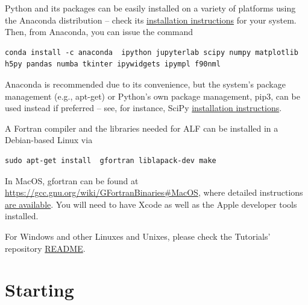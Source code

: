 \documentclass[10pt,modern]{scrartcl}
\numberwithin{exerciseitem}{exercise} %
\newcommand{\ALFver}{2.4}          %
\newcommand{\tutALFver}{2.4}       %
\begin{document}
Python and its packages can be easily installed on a variety of platforms using the Anaconda distribution -- check its \href{https://docs.anaconda.com/anaconda/install/}{installation instructions} for your system. Then, from Anaconda, you can issue the command
\begin{lstlisting}[style=bash]
conda install -c anaconda  ipython jupyterlab scipy numpy matplotlib h5py pandas numba tkinter ipywidgets ipympl f90nml
\end{lstlisting}
Anaconda is recommended due to its convenience, but the system's package management (e.g., apt-get) or Python's own package management, pip3, can be used instead if preferred -- see, for instance, SciPy \href{https://www.scipy.org/install.html}{installation instructions}.

A Fortran compiler and the libraries needed for ALF can be installed in a Debian-based Linux via
\begin{lstlisting}[style=bash]
sudo apt-get install  gfortran liblapack-dev make
\end{lstlisting}
In MacOS, gfortran can be found at \url{https://gcc.gnu.org/wiki/GFortranBinaries#MacOS}, where detailed instructions \href{https://gcc.gnu.org/wiki/GFortranBinariesMacOS}{are available}. You will need to have Xcode as well as the Apple developer tools installed.

For Windows and other Linuxes and Unixes, please check the Tutorials' repository \href{https://git.physik.uni-wuerzburg.de/ALF/ALF_Tutorial/-/blob/master/Tutorial-ALF-\tutALFver/README.md}{README}.

\section*{Starting}
\end{document}
